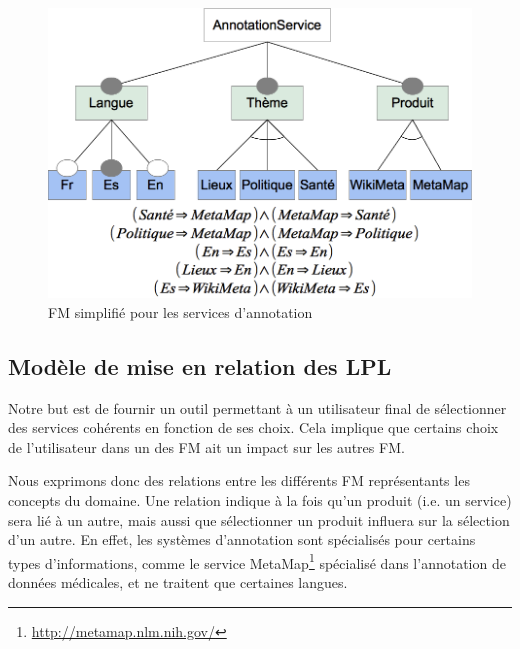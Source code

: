 \documentclass[]{easychair}
\newcommand{\comment}[4]{\par\noindent\hspace*{-0.5cm}{\parbox{\columnwidth}{\textbf{\color{#1}//#2[#3]:#4}}}\par}
\newcommand{\si}[1]{\comment{red}{}{#1}{SI}}
\begin{document}
\begin{figure}[htb!]
	\begin{centering}
	\includegraphics[scale=0.4]{FM.png}
	\caption{FM simplifié pour les services d'annotation}
	\label{fig:mmFM}
	\end{centering}
\end{figure}

\subsection{Modèle de mise en relation des LPL}
Notre but est de fournir un outil permettant à un utilisateur final de sélectionner des services cohérents en fonction de ses choix. Cela implique que certains choix de l'utilisateur dans un des FM ait un impact sur les autres FM.

Nous exprimons donc des relations entre les différents FM représentants les concepts du domaine. Une relation indique à la fois qu'un produit (i.e. un service) sera lié à un autre, mais aussi que sélectionner un produit influera sur la sélection d'un autre. En effet, les systèmes d'annotation sont spécialisés pour certains types d'informations, comme le service MetaMap\footnote{\url{http://metamap.nlm.nih.gov/}} spécialisé dans l'annotation de données médicales, et ne traitent que certaines langues.
\end{document}
